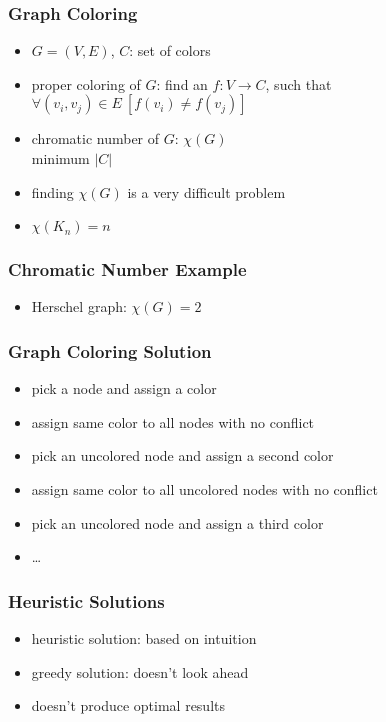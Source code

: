 \documentclass[dvipsnames]{beamer}
\begin{document}
\begin{frame}
  \frametitle{Graph Coloring}

  \begin{itemize}
    \item $G=(V,E)$, $C$: set of colors
    \item \alert{proper coloring} of $G$: find an $f: V \rightarrow C$,
      such that\\
      $\forall (v_i,v_j) \in E~[f(v_i) \neq f(v_j)]$

    \pause
    \medskip
    \item \alert{chromatic number} of $G$: $\chi (G)$\\
      minimum $|C|$
     \item finding $\chi (G)$ is a very difficult problem

     \pause
     \smallskip
     \item $\chi (K_n) = n$
  \end{itemize}
\end{frame}

\begin{frame}
  \frametitle{Chromatic Number Example}

  \begin{center}
  \end{center}

  \begin{itemize}
    \item Herschel graph: $\chi (G)=2$
  \end{itemize}
\end{frame}

\begin{frame}
  \frametitle{Graph Coloring Solution}

  \begin{itemize}
    \item pick a node and assign a color
    \item assign same color to all nodes with no conflict
    \item pick an uncolored node and assign a second color
    \item assign same color to all uncolored nodes with no conflict
    \item pick an uncolored node and assign a third color
    \item \ldots
  \end{itemize}
\end{frame}

\begin{frame}
  \frametitle{Heuristic Solutions}

  \begin{itemize}
    \item \alert{heuristic} solution: based on intuition
    \item \alert{greedy} solution: doesn't look ahead
    \item doesn't produce optimal results
  \end{itemize}
\end{frame}
\end{document}

